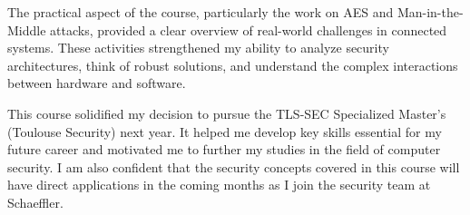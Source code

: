 \noindent The practical aspect of the course, particularly the work on AES and Man-in-the-Middle attacks, provided a clear overview of real-world challenges in connected systems. These activities strengthened my ability to analyze security architectures, think of robust solutions, and understand the complex interactions between hardware and software.

\noindent This course solidified my decision to pursue the TLS-SEC Specialized Master's (Toulouse Security) next year. It helped me develop key skills essential for my future career and motivated me to further my studies in the field of computer security. I am also confident that the security concepts covered in this course will have direct applications in the coming months as I join the security team at Schaeffler.
